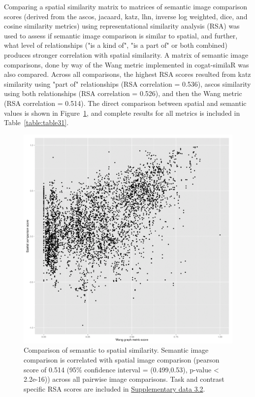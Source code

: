 \documentclass{report}
\begin{document}
Comparing a spatial similarity matrix to matrices of semantic image comparison scores (derived from the ascos, jacaard, katz, lhn, inverse log weighted, dice, and cosine similarity metrics) using representational similarity analysis (RSA) was used to assess if semantic image comparison is similar to spatial, and further, what level of relationships ("is a kind of", "is a part of" or both combined) produces stronger correlation with spatial similarity. A matrix of semantic image comparisons, done by way of the Wang metric implemented in cogat-similaR \cite{CognitiveAtlas_undated-hk} was also compared. Across all comparisons, the highest RSA scores resulted from katz similarity using "part of" relationships (RSA correlation = 0.536), ascos similarity using both relationships (RSA correlation = 0.526), and then the Wang metric (RSA correlation = 0.514). The direct comparison between spatial and semantic values is shown in Figure~\ref{fig:33}, and complete results for all metrics is included in Table~\ref{table:table31}.

\begin{figure}[h!]
\begin{center}
\includegraphics[width=15cm]{images/figure33.png}
\end{center}
 \caption{\label{fig:33} Comparison of semantic to spatial similarity. Semantic image
comparison is correlated with spatial image comparison (pearson score of
0.514 (95\% confidence interval = (0.499,0.53), p-value \textless{}
2.2e-16)) across all pairwise image comparisons. Task and contrast
specific RSA scores are included in \href{https://github.com/vsoch/thesis/blob/master/supplementary/chapter3/supp1_spatial_semantic_rsa_df.csv}{Supplementary data 3.2}.}
\end{figure}
\end{document}

